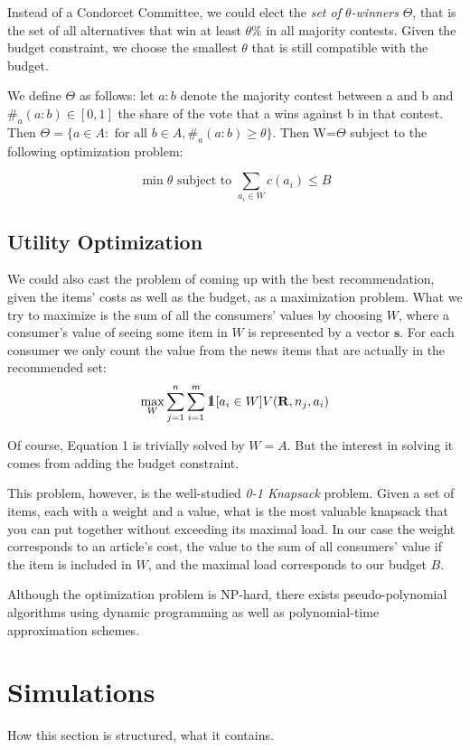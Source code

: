 \documentclass{article}
\def\one{\mbox{1\hspace{-4.25pt}\fontsize{12}{14.4}\selectfont\textrm{1}}} %
\begin{document}
Instead of a Condorcet Committee, we could elect the \emph {set of $\theta$-winners} $\Theta$, that is the set
of all alternatives that win at least $\theta \% $ in all majority contests. Given the budget constraint, we
choose the smallest $\theta$ that is still compatible with the budget.

We define $\Theta$ as follows: let $a:b$ denote the majority contest between a and b and $\#_a(a:b)\in [0,1]$ the
share of the vote that a wins against b in that contest. Then $\Theta=\{a\in A: \text { for all } b\in A, \#_a(a:b)\geq \theta\}$. Then W=$\Theta$ subject to the following optimization problem:

\[\min \theta \text{ subject to } \sum_{a_i\in W}c(a_i)\leq B\]

\subsection{Utility Optimization}
We could also cast the problem of coming up with the best recommendation, 
given the items' costs as well as the budget, as a maximization problem. 
What we try to maximize is the sum of all the consumers' values by choosing $W$, 
where a consumer's value of seeing some item in $W$ is represented by a vector $\mathbf{s}$. 
For each consumer we only count the value from the news items that are actually in the recommended set:\\
\[
\max_W \sum_{j=1}^n \sum_{i=1}^m \one [a_i\in W] V(\mathbf{R}, n_j, a_i)
\]

Of course, Equation 1 is trivially solved by $W=A$. 
But the interest in solving it comes from adding the budget constraint.


This problem, however, is the well-studied {\em 0-1 Knapsack} problem. 
Given a set of items, each with a weight and a value, 
what is the most valuable knapsack that you can put together without exceeding its maximal load. 
In our case the weight corresponds to an article's cost, 
the value to the sum of all consumers' value if the item is included in $W$, 
and the maximal load corresponds to our budget $B$. 

Although the optimization problem is NP-hard, there exists pseudo-polynomial algorithms using dynamic programming 
as well as polynomial-time approximation schemes. 
\section{Simulations}%
How this section is structured, what it contains.
\end{document}
